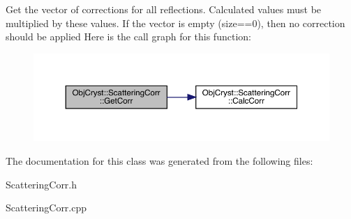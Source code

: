 Get the vector of corrections for all reflections. Calculated values must be multiplied by these values. If the vector is empty (size==0), then no correction should be applied Here is the call graph for this function\+:
\nopagebreak
\begin{figure}[H]
\begin{center}
\leavevmode
\includegraphics[width=350pt]{class_obj_cryst_1_1_scattering_corr_a984d75f2c772be383be38cb393183281_cgraph}
\end{center}
\end{figure}


The documentation for this class was generated from the following files\+:\begin{DoxyCompactItemize}
\item 
Scattering\+Corr.\+h\item 
Scattering\+Corr.\+cpp\end{DoxyCompactItemize}
